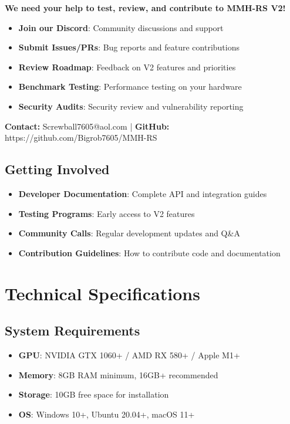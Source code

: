 \documentclass[12pt,a4paper]{article}
\makeatletter
\newcommand{\email}{Screwball7605@aol.com}
\newcommand{\github}{https://github.com/Bigrob7605/MMH-RS}
\makeatother
\begin{document}
\begin{tcolorbox}[colback=orange!10,colframe=orange!50,title=\textbf{Help Us Build MMH-RS V2}]
\textbf{We need your help to test, review, and contribute to MMH-RS V2!}

\begin{itemize}
    \item \textbf{Join our Discord}: Community discussions and support
    \item \textbf{Submit Issues/PRs}: Bug reports and feature contributions
    \item \textbf{Review Roadmap}: Feedback on V2 features and priorities
    \item \textbf{Benchmark Testing}: Performance testing on your hardware
    \item \textbf{Security Audits}: Security review and vulnerability reporting
\end{itemize}

\textbf{Contact:} \email{} | \textbf{GitHub:} \github
\end{tcolorbox}

\subsection{Getting Involved}
\begin{itemize}
    \item \textbf{Developer Documentation}: Complete API and integration guides
    \item \textbf{Testing Programs}: Early access to V2 features
    \item \textbf{Community Calls}: Regular development updates and Q\&A
    \item \textbf{Contribution Guidelines}: How to contribute code and documentation
\end{itemize}

\section{Technical Specifications}

\subsection{System Requirements}
\begin{itemize}
    \item \textbf{GPU}: NVIDIA GTX 1060+ / AMD RX 580+ / Apple M1+
    \item \textbf{Memory}: 8GB RAM minimum, 16GB+ recommended
    \item \textbf{Storage}: 10GB free space for installation
    \item \textbf{OS}: Windows 10+, Ubuntu 20.04+, macOS 11+
\end{itemize}
\end{document}
